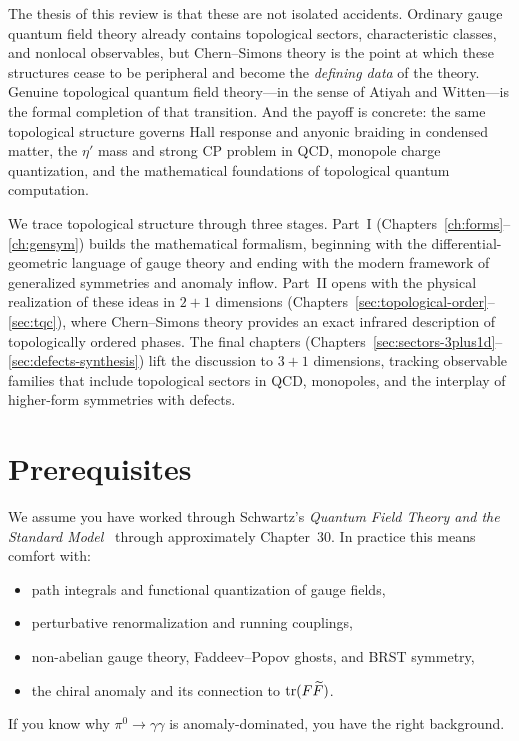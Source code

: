 The thesis of this review is that these are not isolated accidents.  Ordinary gauge quantum field theory already contains topological sectors, characteristic classes, and nonlocal observables, but Chern--Simons theory is the point at which these structures cease to be peripheral and become the \emph{defining data} of the theory.  Genuine topological quantum field theory---in the sense of Atiyah and Witten---is the formal completion of that transition.  And the payoff is concrete: the same topological structure governs Hall response and anyonic braiding in condensed matter, the $\eta'$ mass and strong CP problem in QCD, monopole charge quantization, and the mathematical foundations of topological quantum computation.

We trace topological structure through three stages.  Part~I (Chapters~\ref{ch:forms}--\ref{ch:gensym}) builds the mathematical formalism, beginning with the differential-geometric language of gauge theory and ending with the modern framework of generalized symmetries and anomaly inflow.  Part~II opens with the physical realization of these ideas in $2{+}1$ dimensions (Chapters~\ref{sec:topological-order}--\ref{sec:tqc}), where Chern--Simons theory provides an exact infrared description of topologically ordered phases.  The final chapters (Chapters~\ref{sec:sectors-3plus1d}--\ref{sec:defects-synthesis}) lift the discussion to $3{+}1$ dimensions, tracking observable families that include topological sectors in QCD, monopoles, and the interplay of higher-form symmetries with defects.


\section{Prerequisites}\label{sec:audience}

We assume you have worked through Schwartz's \emph{Quantum Field Theory and the Standard Model}~\cite{Schwartz2014QFT} through approximately Chapter~30.  In practice this means comfort with:
\begin{itemize}
\item path integrals and functional quantization of gauge fields,
\item perturbative renormalization and running couplings,
\item non-abelian gauge theory, Faddeev--Popov ghosts, and BRST symmetry,
\item the chiral anomaly and its connection to $\operatorname{tr}(F\widetilde{F})$.
\end{itemize}
If you know why $\pi^0\to\gamma\gamma$ is anomaly-dominated, you have the right background.

